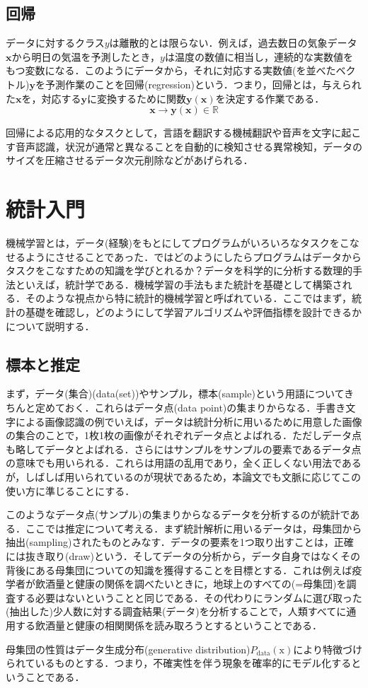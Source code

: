 \documentclass[a4paper,11pt]{jsreport}
\begin{document}
\subsection*{回帰}
データに対するクラス$y$は離散的とは限らない．例えば，過去数日の気象データ$\bm{x}$から明日の気温を予測したとき，$y$は温度の数値に相当し，連続的な実数値をもつ変数になる．このようにデータから，それに対応する実数値(を並べたベクトル)$\bm{y}$を予測作業のことを回帰(regression)という．つまり，回帰とは，与えられた$\bm{x}$を，対応する$\bm{y}$に変換するために関数$\bm{y}(\bm{x})$を決定する作業である．
\begin{equation}
  \bm{x} \longrightarrow \bm{y}(\bm{x}) \in \mathbb{R}
\end{equation}
\par
回帰による応用的なタスクとして，言語を翻訳する機械翻訳や音声を文字に起こす音声認識，状況が通常と異なることを自動的に検知させる異常検知，データのサイズを圧縮させるデータ次元削除などがあげられる．

\section{統計入門}
機械学習とは，データ(経験)をもとにしてプログラムがいろいろなタスクをこなせるようにさせることであった．ではどのようにしたらプログラムはデータからタスクをこなすための知識を学びとれるか？データを科学的に分析する数理的手法といえば，統計学である．機械学習の手法もまた統計を基礎として構築される．そのような視点から特に統計的機械学習と呼ばれている．ここではまず，統計の基礎を確認し，どのようにして学習アルゴリズムや評価指標を設計できるかについて説明する．
\subsection{標本と推定}
まず，データ(集合)(data(set))やサンプル，標本(sample)という用語についてきちんと定めておく．これらはデータ点(data point)の集まりからなる．手書き文字による画像認識の例でいえば，データは統計分析に用いるために用意した画像の集合のことで，1枚1枚の画像がそれぞれデータ点とよばれる．ただしデータ点も略してデータとよばれる．さらにはサンプルをサンプルの要素であるデータ点の意味でも用いられる．これらは用語の乱用であり，全く正しくない用法であるが，しばしば用いられているのが現状であるため，本論文でも文脈に応じてこの使い方に準じることにする．\par
このようなデータ点(サンプル)の集まりからなるデータを分析するのが統計である．ここでは推定について考える．まず統計解析に用いるデータは，母集団から抽出(sampling)されたものとみなす．データの要素を1つ取り出すことは，正確には抜き取り(draw)という．そしてデータの分析から，データ自身ではなくその背後にある母集団についての知識を獲得することを目標とする．これは例えば疫学者が飲酒量と健康の関係を調べたいときに，地球上のすべての(=母集団)を調査する必要はないということと同じである．その代わりにランダムに選び取った(抽出した)少人数に対する調査結果(データ)を分析することで，人類すべてに通用する飲酒量と健康の相関関係を読み取ろうとするということである．\par
母集団の性質はデータ生成分布(generative distribution)$P_{\text{data}}(\mathrm{x})$により特徴づけられているものとする．つまり，不確実性を伴う現象を確率的にモデル化するということである．
\end{document}
